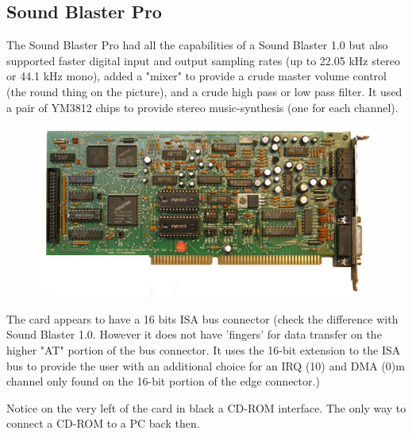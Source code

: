 \documentclass[book.tex]{subfiles}
\begin{document}
  \subsection{Sound Blaster Pro}
The Sound Blaster Pro had all the capabilities of a Sound Blaster 1.0 but also supported faster digital input and output sampling rates (up to 22.05 kHz stereo or 44.1 kHz mono), added a "mixer" to provide a crude master volume control (the round thing on the picture), and a crude high pass or low pass filter. It used a pair of YM3812 chips to provide stereo music-synthesis (one for each channel).\\
\begin{figure}[H] \centering \includegraphics[width=\textwidth]{screenshots/hardware/sbpro.png} \end{figure}
 The card appears to have a 16 bits ISA bus connector (check the difference with Sound Blaster 1.0. However it does not have 'fingers' for data transfer on the higher "AT" portion of the bus connector. It uses the 16-bit extension to the ISA bus to provide the user with an additional choice for an IRQ (10) and DMA (0)m channel only found on the 16-bit portion of the edge connector.)\\
\par
{} Notice on the very left of the card in black a CD-ROM interface. The only way to connect a CD-ROM to a PC back then.
\end{document}
